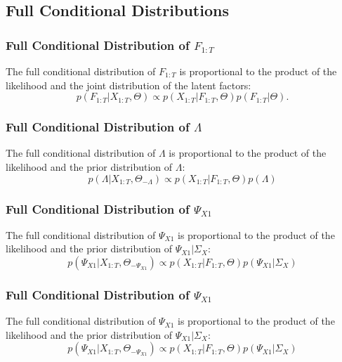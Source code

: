 \subsection{Full Conditional Distributions}
\subsubsection{Full Conditional Distribution of $F_{1:T}$}
The full conditional distribution of $F_{1:T}$ is proportional to the product of the likelihood and the joint distribution of the latent factors:
\begin{equation}
	p \left( F_{1:T} | X_{1:T}, \Theta \right) \propto p \left( X_{1:T} | F_{1:T}, \Theta \right) p \left( F_{1:T} | \Theta \right).
\end{equation}

\subsubsection{Full Conditional Distribution of $\Lambda$}
The full conditional distribution of $\Lambda$ is proportional to the product of the likelihood and the prior distribution of $\Lambda$:
\begin{equation}
	p \left( \Lambda | X_{1:T}, \Theta_{-\Lambda} \right) \propto p \left( X_{1:T} | F_{1:T}, \Theta \right) p \left( \Lambda \right)
\end{equation}

\subsubsection{Full Conditional Distribution of $\Psi_{X1}$}
The full conditional distribution of $\Psi_{X1}$ is proportional to the product of the likelihood and the prior distribution of $\Psi_{X1} | \Sigma_{X}$:
\begin{equation}
	p \left( \Psi_{X1}| X_{1:T}, \Theta_{-\Psi_{X1}} \right) \propto p \left( X_{1:T} | F_{1:T}, \Theta \right) p \left( \Psi_{X1} | \Sigma_{X} \right)
\end{equation}

\subsubsection{Full Conditional Distribution of $\Psi_{X1}$}
The full conditional distribution of $\Psi_{X1}$ is proportional to the product of the likelihood and the prior distribution of $\Psi_{X1} | \Sigma_{X}$:
\begin{equation}
	p \left( \Psi_{X1}| X_{1:T}, \Theta_{-\Psi_{X1}} \right) \propto p \left( X_{1:T} | F_{1:T}, \Theta \right) p \left( \Psi_{X1} | \Sigma_{X} \right)
\end{equation}

